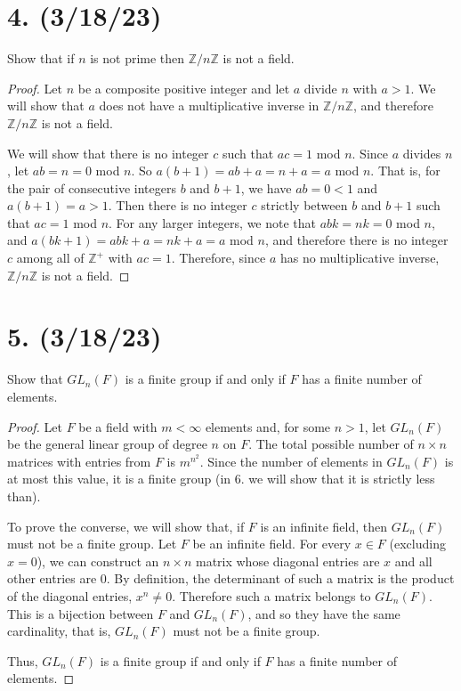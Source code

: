 \documentclass{article}
\begin{document}
\section*{4. (3/18/23)}

Show that if $n$ is not prime then $\mathbb{Z}/n\mathbb{Z}$ is not a field.

\begin{proof}
    Let $n$ be a composite positive integer and let $a$ divide $n$ with $a > 1$. We will show that $a$ does not have a multiplicative inverse in $\mathbb{Z}/n\mathbb{Z}$, and therefore $\mathbb{Z}/n\mathbb{Z}$ is not a field.

    We will show that there is no integer $c$ such that $ac = 1$ mod $n$. Since $a$ divides $n$, let $ab = n = 0$ mod $n$. So $a(b + 1) = ab + a = n + a = a$ mod $n$. That is, for the pair of consecutive integers $b$ and $b + 1$, we have $ab = 0 < 1$ and $a(b + 1) = a > 1$. Then there is no integer $c$ strictly between $b$ and $b + 1$ such that $ac = 1$ mod $n$. For any larger integers, we note that $abk = nk = 0$ mod $n$, and $a(bk + 1) = abk + a = nk + a = a$ mod $n$, and therefore there is no integer $c$ among all of $\mathbb{Z}^+$ with $ac = 1$. Therefore, since $a$ has no multiplicative inverse, $\mathbb{Z}/n\mathbb{Z}$ is not a field.
\end{proof}

\section*{5. (3/18/23)}

Show that $GL_n(F)$ is a finite group if and only if $F$ has a finite number of elements.

\begin{proof}
    Let $F$ be a field with $m < \infty$ elements and, for some $n > 1$, let $GL_n(F)$ be the general linear group of degree $n$ on $F$. The total possible number of $n \times n$ matrices with entries from $F$ is $m^{n^2}$. Since the number of elements in $GL_n(F)$ is at most this value, it is a finite group (in 6. we will show that it is strictly less than).

    To prove the converse, we will show that, if $F$ is an infinite field, then $GL_n(F)$ must not be a finite group. Let $F$ be an infinite field. For every $x \in F$ (excluding $x = 0$), we can construct an $n \times n$ matrix whose diagonal entries are $x$ and all other entries are 0. By definition, the determinant of such a matrix is the product of the diagonal entries, $x^n \neq 0$. Therefore such a matrix belongs to $GL_n(F)$. This is a bijection between $F$ and $GL_n(F)$, and so they have the same cardinality, that is, $GL_n(F)$ must not be a finite group.

    Thus, $GL_n(F)$ is a finite group if and only if $F$ has a finite number of elements.
\end{proof}
\end{document}
